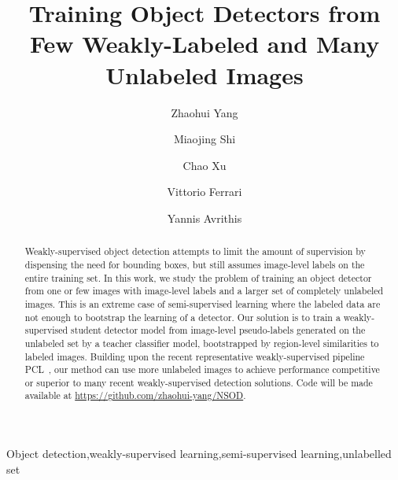 \documentclass[review]{elsarticle}
\begin{document}
\begin{frontmatter}
\title{Training Object Detectors from Few Weakly-Labeled and Many Unlabeled Images}


\author{Zhaohui Yang}
\author{Miaojing Shi}
\author{Chao Xu}
\author{Vittorio Ferrari}
\author{Yannis Avrithis}


















\begin{abstract}


Weakly-supervised object detection attempts to limit the amount of supervision by dispensing the need for bounding boxes, but still assumes image-level labels on the entire training set.
In this work, we study the problem of training an object detector from one or few images with image-level labels and a larger set of completely unlabeled images. This is an extreme case of semi-supervised learning where the labeled data are not enough to bootstrap the learning of a detector.
Our solution is to train a weakly-supervised student detector model
from image-level pseudo-labels generated on the unlabeled set by a teacher classifier model, bootstrapped by region-level similarities to
labeled images. Building upon the recent representative weakly-supervised  pipeline PCL~\cite{tang2018pami},
our method can use
more unlabeled images to achieve
performance competitive or superior to many recent weakly-supervised detection solutions.
Code will be made available at \url{https://github.com/zhaohui-yang/NSOD}.
\end{abstract}

\begin{keyword}
Object detection\sep weakly-supervised learning\sep semi-supervised learning\sep unlabelled set
\end{keyword}

\end{frontmatter}
\end{document}
